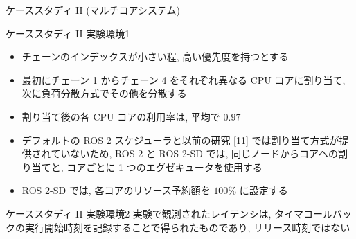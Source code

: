 \begin{frame}{ケーススタディ II (マルチコアシステム)}
\end{frame}

\begin{frame}{ケーススタディ II 実験環境1}
    \begin{itemize}
        \item チェーンのインデックスが小さい程, 高い優先度を持つとする
        \item 最初にチェーン 1 からチェーン 4 をそれぞれ異なる CPU コアに割り当て, 次に負荷分散方式でその他を分散する
        \item 割り当て後の各 CPU コアの利用率は, 平均で $0.97$
        \item デフォルトの ROS 2 スケジューラと以前の研究 [11] では割り当て方式が提供されていないため, ROS 2 と ROS 2-SD では, 同じノードからコアへの割り当てと, コアごとに 1 つのエグゼキュータを使用する
        \item ROS 2-SD では, 各コアのリソース予約額を $100 \%$ に設定する
    \end{itemize}
\end{frame}

\begin{frame}[label=latency]{ケーススタディ II 実験環境2}
    実験で観測されたレイテンシは, タイマコールバックの実行開始時刻を記録することで得られたものであり, リリース時刻ではない
\end{frame}


